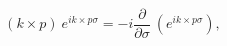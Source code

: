 \begin{equation}
  (k \times p)~ e^{i k \times p \sigma}
  = -i \frac{\partial}{\partial \sigma}~
       (e^{i k \times p \sigma}),
\end{equation}

